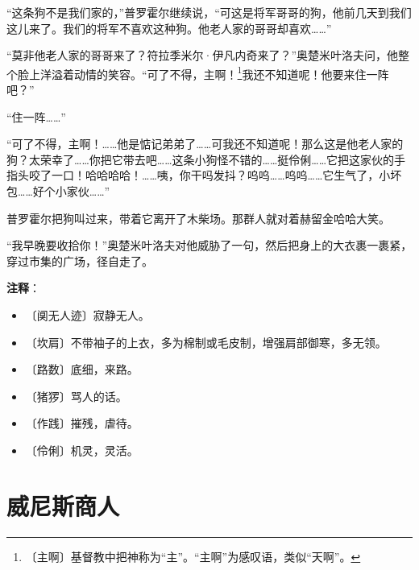 \documentclass[12pt,UTF-8,openany]{ctexbook}
\begin{document}
\begin{large}
    “这条狗不是我们家的，”普罗霍尔继续说，“可这是将军哥哥的狗，他前几天到我们这儿来了。我们的将军不喜欢这种狗。他老人家的哥哥却喜欢……”
    
    “莫非他老人家的哥哥来了？符拉季米尔·伊凡内奇来了？”奥楚米叶洛夫问，他整个脸上洋溢着动情的笑容。“可了不得，主啊！\footnote{〔主啊〕基督教中把神称为“主”。“主啊”为感叹语，类似“天啊”。}我还不知道呢！他要来住一阵吧？”
    
    “住一阵……”
    
    “可了不得，主啊！……他是惦记弟弟了……可我还不知道呢！那么这是他老人家的狗？太荣幸了……你把它带去吧……这条小狗怪不错的……挺伶俐……它把这家伙的手指头咬了一口！哈哈哈哈！……咦，你干吗发抖？呜呜……呜呜……它生气了，小坏包……好个小家伙……”
    
    普罗霍尔把狗叫过来，带着它离开了木柴场。那群人就对着赫留金哈哈大笑。
    
    “我早晚要收拾你！”奥楚米叶洛夫对他威胁了一句，然后把身上的大衣裹一裹紧，穿过市集的广场，径自走了。
    
\end{large}


\newpage

\textbf{注释}：

\vspace{-1em}

\begin{itemize}
    \setlength\itemsep{-0.2em}
    \item 〔阒无人迹〕寂静无人。
    \item 〔坎肩〕不带袖子的上衣，多为棉制或毛皮制，增强肩部御寒，多无领。
    \item 〔路数〕底细，来路。
    \item 〔猪猡〕骂人的话。
    \item 〔作践〕摧残，虐待。
    \item 〔伶俐〕机灵，灵活。
\end{itemize}

\chapter{威尼斯商人}
\end{document}
